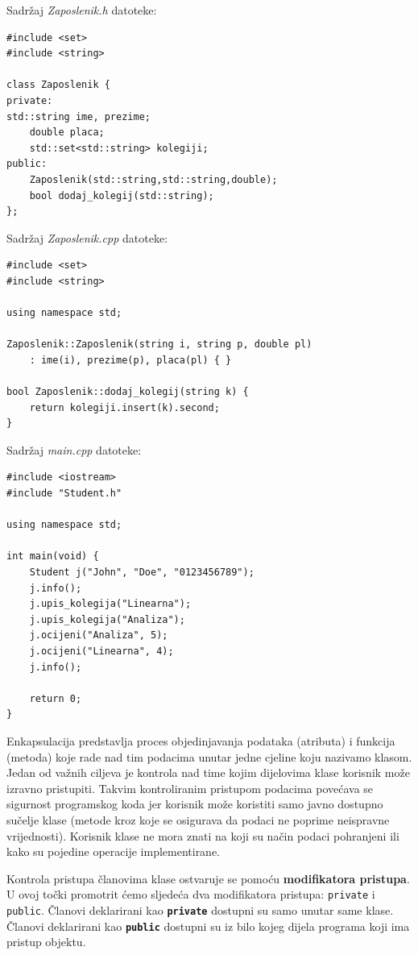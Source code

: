 Sadržaj \textit{Zaposlenik.h} datoteke:

\begin{verbatim}
#include <set>
#include <string>

class Zaposlenik {
private:
std::string ime, prezime;
    double placa;
    std::set<std::string> kolegiji;
public:
    Zaposlenik(std::string,std::string,double);
    bool dodaj_kolegij(std::string);
};
\end{verbatim}


Sadržaj \textit{Zaposlenik.cpp} datoteke:

\begin{verbatim}
#include <set>
#include <string>

using namespace std;

Zaposlenik::Zaposlenik(string i, string p, double pl)
    : ime(i), prezime(p), placa(pl) { }

bool Zaposlenik::dodaj_kolegij(string k) {
    return kolegiji.insert(k).second;
}
\end{verbatim}


Sadržaj \textit{main.cpp} datoteke:

\begin{verbatim}
#include <iostream>
#include "Student.h"

using namespace std;

int main(void) {
    Student j("John", "Doe", "0123456789");
    j.info();
    j.upis_kolegija("Linearna");
    j.upis_kolegija("Analiza");
    j.ocijeni("Analiza", 5);
    j.ocijeni("Linearna", 4);
    j.info();

    return 0;
}
\end{verbatim}


Enkapsulacija predstavlja proces objedinjavanja podataka (atributa) 
i funkcija (metoda) koje rade nad tim podacima unutar jedne cjeline koju nazivamo klasom. 
Jedan od važnih ciljeva je kontrola nad time kojim dijelovima klase korisnik može izravno pristupiti.
Takvim kontroliranim pristupom podacima povećava se sigurnost programskog koda
jer korisnik može koristiti samo javno dostupno sučelje
klase (metode kroz koje se osigurava da podaci ne poprime neispravne vrijednosti).
Korisnik klase ne mora znati na koji su način podaci pohranjeni ili kako su pojedine operacije implementirane.
\medskip

Kontrola pristupa članovima klase ostvaruje se pomoću \textbf{modifikatora pristupa}.
U ovoj točki promotrit ćemo sljedeća dva modifikatora pristupa:
\texttt{private} i \texttt{public}.
Članovi deklarirani kao \textbf{\texttt{private}} dostupni su samo unutar same klase.
Članovi deklarirani kao \textbf{\texttt{public}} dostupni su iz bilo kojeg dijela programa koji ima pristup objektu.
\medskip

